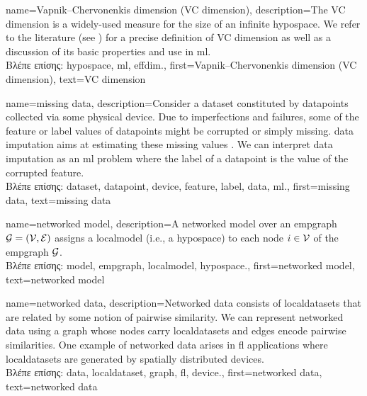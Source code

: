 {name={Vapnik–Chervonenkis dimension (VC dimension)},
	description={The VC dimension is a widely-used measure for 
		the size of an infinite \gls{hypospace}. We refer to the literature (see \cite{ShalevMLBook}) for a precise definition 
		of VC dimension as well as a discussion of its basic properties and use in \gls{ml}.\\
		\foreignlanguage{greek}{Βλέπε επίσης:} \gls{hypospace}, \gls{ml}, \gls{effdim}.},
	first={Vapnik–Chervonenkis dimension (VC dimension)},
	text={VC dimension}  
}

{name={missing data},
	description={Consider a \gls{dataset} constituted by \gls{datapoint}s collected via 
		some physical \gls{device}. Due to imperfections and failures, some of the \gls{feature} 
		or \gls{label} values of \gls{datapoint}s might be corrupted or simply missing. 
		\Gls{data} imputation aims at estimating these missing values \cite{Abayomi2008DiagnosticsFM}. 
		We can interpret \gls{data} imputation as an \gls{ml} problem where the \gls{label} of a \gls{datapoint} is 
		the value of the corrupted \gls{feature}.\\
		\foreignlanguage{greek}{Βλέπε επίσης:} \gls{dataset}, \gls{datapoint}, \gls{device}, \gls{feature}, \gls{label}, \gls{data}, \gls{ml}.},
	first={missing data},
	text={missing data}  
}

{name={networked model},
	description={A networked \gls{model} over an \gls{empgraph} $\mathcal{G} = \left( \mathcal{V},\mathcal{E} \right)$ assigns 
   		a \gls{localmodel} (i.e., a \gls{hypospace}) to each node $i \in \mathcal{V}$ of the \gls{empgraph} $\mathcal{G}$.\\
  	 	\foreignlanguage{greek}{Βλέπε επίσης:} \gls{model}, \gls{empgraph}, \gls{localmodel}, \gls{hypospace}.}, 
   	first={networked model},
   	text={networked model}  
}

{name={networked data},
	description={Networked \gls{data} consists of \gls{localdataset}s 
		that are related by some notion of pairwise similarity. We can represent networked 
		\gls{data} using a \gls{graph} whose nodes carry \gls{localdataset}s and edges encode 
		pairwise similarities. One example of networked \gls{data} arises in \gls{fl} applications 
		where \gls{localdataset}s are generated by spatially distributed \gls{device}s.\\
		\foreignlanguage{greek}{Βλέπε επίσης:} \gls{data}, \gls{localdataset}, \gls{graph}, \gls{fl}, \gls{device}.}, 
	first={networked data},
	text={networked data}  
}

